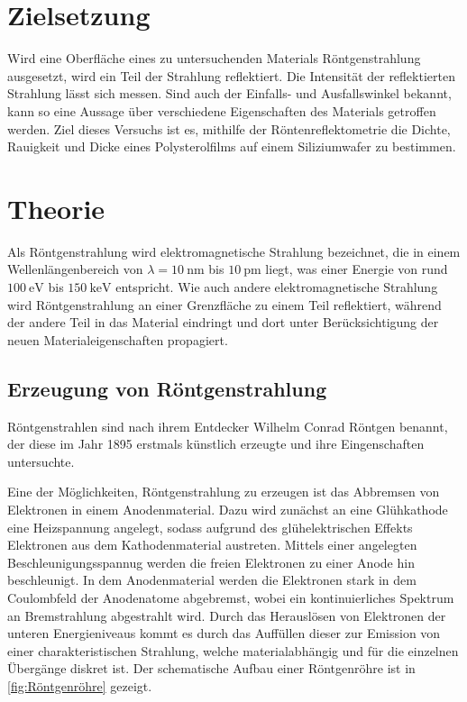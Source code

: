\section{Zielsetzung}
\label{sec:Zielsetzung}
Wird eine Oberfläche eines zu untersuchenden Materials Röntgenstrahlung ausgesetzt, wird ein Teil der Strahlung reflektiert. Die Intensität der reflektierten 
Strahlung lässt sich messen. Sind auch der Einfalls- und Ausfallswinkel bekannt, kann so eine Aussage über verschiedene Eigenschaften des Materials getroffen werden.
Ziel dieses Versuchs ist es, mithilfe der Röntenreflektometrie die Dichte, Rauigkeit und Dicke eines Polysterolfilms auf einem Siliziumwafer zu bestimmen.

\section{Theorie}
\label{sec:Theorie}
Als Röntgenstrahlung wird elektromagnetische Strahlung bezeichnet, die in einem Wellenlängenbereich von $\lambda = \qty{10}{\nano\metre}$ bis $\qty{10}{\pico\metre}$
liegt, was einer Energie von rund $\qty{100}{\eV}$ bis $\qty{150}{\kilo\eV}$ entspricht. Wie auch andere elektromagnetische Strahlung wird Röntgenstrahlung 
an einer Grenzfläche zu einem Teil reflektiert, während der andere Teil in das Material eindringt und dort unter Berücksichtigung der neuen Materialeigenschaften
propagiert.

\subsection{Erzeugung von Röntgenstrahlung}
Röntgenstrahlen sind nach ihrem Entdecker Wilhelm Conrad Röntgen benannt, der diese im Jahr 1895 erstmals künstlich erzeugte und ihre Eingenschaften untersuchte.

Eine der Möglichkeiten, Röntgenstrahlung zu erzeugen ist das Abbremsen von Elektronen in einem Anodenmaterial.
Dazu wird zunächst an eine Glühkathode eine Heizspannung angelegt, sodass aufgrund des glühelektrischen Effekts Elektronen aus dem Kathodenmaterial austreten.
Mittels einer angelegten Beschleunigungsspannug werden die freien Elektronen zu einer Anode hin beschleunigt. In dem Anodenmaterial werden die Elektronen stark in
dem Coulombfeld der Anodenatome abgebremst, wobei ein kontinuierliches Spektrum an Bremstrahlung abgestrahlt wird. 
Durch das Herauslösen von Elektronen der unteren Energieniveaus kommt es durch das Auffüllen dieser zur Emission von einer charakteristischen Strahlung, welche
materialabhängig und für die einzelnen Übergänge diskret ist.
Der schematische Aufbau einer Röntgenröhre ist in \autoref{fig:Röntgenröhre} gezeigt.

